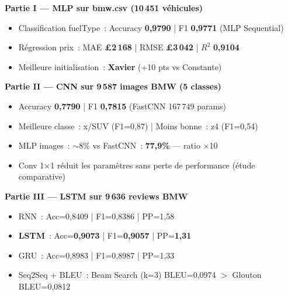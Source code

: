 \documentclass[12pt,a4paper]{report}
\begin{document}
\begin{resultbox}
\textbf{Partie I --- MLP sur bmw.csv (10\,451 véhicules)}
\begin{itemize}[leftmargin=*,nosep]
  \item Classification fuelType~: Accuracy \textbf{0,9790} | F1 \textbf{0,9771} (MLP Sequential)
  \item Régression prix~: MAE \textbf{\pounds 2\,168} | RMSE \textbf{\pounds 3\,042} | $R^2$ \textbf{0,9104}
  \item Meilleure initialisation~: \textbf{Xavier} (+10 pts vs Constante)
\end{itemize}
\smallskip
\textbf{Partie II --- CNN sur 9\,587 images BMW (5 classes)}
\begin{itemize}[leftmargin=*,nosep]
  \item Accuracy \textbf{0,7790} | F1 \textbf{0,7815} (FastCNN 167\,749 params)
  \item Meilleure classe~: x/SUV (F1=0,87) | Moins bonne~: z4 (F1=0,54)
  \item MLP images~: $\sim$8\% vs FastCNN~: \textbf{77,9\%} --- ratio $\times$10
  \item Conv 1$\times$1 réduit les paramètres sans perte de performance (étude comparative)
\end{itemize}
\smallskip
\textbf{Partie III --- LSTM sur 9\,636 reviews BMW}
\begin{itemize}[leftmargin=*,nosep]
  \item RNN~: Acc=0,8409 | F1=0,8386 | PP=1,58
  \item \textbf{LSTM}~: Acc=\textbf{0,9073} | F1=\textbf{0,9057} | PP=\textbf{1,31}
  \item GRU~: Acc=0,8983 | F1=0,8987 | PP=1,33
  \item Seq2Seq + BLEU~: Beam Search (k=3) BLEU=0,0974 $>$ Glouton BLEU=0,0812
\end{itemize}
\end{resultbox}
\end{document}
